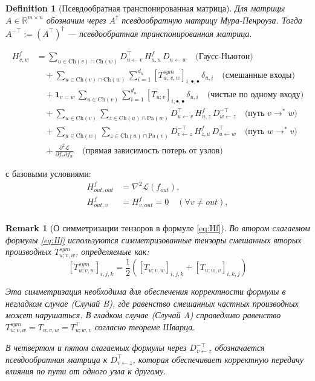 \documentclass[11pt]{article}
\newtheorem{remark}{Remark}
\newtheorem{definition}{Definition}
\newcommand{\Pa}{\mathrm{Pa}} %
\newcommand{\Ch}{\mathrm{Ch}} %
\begin{document}
\begin{definition}[Псевдообратная транспонированная матрица]
  Для матрицы $A \in \mathbb{R}^{m \times n}$ обозначим через $A^{\dagger}$ псевдообратную матрицу
  Мура-Пенроуза. Тогда $A^{-\top} := (A^\top)^{\dagger}$ — псевдообратная транспонированная матрица.
\end{definition}

\begin{equation}\label{eq:Hf}
  \boxed{
    \begin{split}
      H^f_{v,w}
      &=
      \sum_{u\in\Ch(v)\cap\Ch(w)}
      D_{u\gets v}^\top\,H^f_{u,u}\,D_{u\gets w}
      \quad\text{(Гаусс-Ньютон)}\\
      &\quad+
      \sum_{u\in\Ch(v)\cap\Ch(w)}
      \sum_{i=1}^{d_u}
      [T_{u;\,v,w}^{sym}]_{i,\bullet,\bullet}\,\delta_{u,i}
      \quad\text{(смешанные входы)}\\
      &\quad+
      \mathbf{1}_{v=w}\,
      \sum_{u\in\Ch(v)}
      \sum_{i=1}^{d_u}
      [T_{u;v}]_{i,\bullet,\bullet}\,\delta_{u,i}
      \quad\text{(чистые по одному входу)}\\
      &\quad+
      \sum_{u\in\Ch(v)}\sum_{z\in\Ch(u)\cap\Pa(w)}
      D_{u\gets v}^\top\,H^f_{u,z}\,D_{w\gets z}^{-\top}
      \quad\text{(путь $v \rightarrow^* w$)}\\
      &\quad+
      \sum_{u\in\Ch(w)}\sum_{z\in\Ch(u)\cap\Pa(v)}
      D_{v\gets z}^{-\top}\,H^f_{z,u}\,D_{u\gets w}^\top
      \quad\text{(путь $w \rightarrow^* v$)}\\
      &\quad+
      \frac{\partial^2 \mathcal{L}}{\partial f_v \partial f_w}
      \quad\text{(прямая зависимость потерь от узлов)}
    \end{split}
  }
\end{equation}

с базовыми условиями:
\begin{align}
  H^f_{out,out} &= \nabla^2\mathcal L(f_{out}), \nonumber\\
  H^f_{out,v} &= H^f_{v,out} = 0\quad (\forall v\neq out), \nonumber\\
\end{align}

\begin{remark}[О симметризации тензоров в формуле \eqref{eq:Hf}]
  Во втором слагаемом формулы \eqref{eq:Hf} используются симметризованные тензоры смешанных вторых
  производных $T_{u;v,w}^{sym}$, определяемые как:
  \[
    [T_{u;v,w}^{sym}]_{i,j,k} = \frac{1}{2}([T_{u;v,w}]_{i,j,k} + [T_{u;w,v}]_{i,k,j})
  \]

  Эта симметризация необходима для обеспечения корректности формулы в негладком случае (Случай B),
  где равенство смешанных частных производных может нарушаться. В гладком случае (Случай A)
  справедливо равенство $T_{u;v,w}^{sym} = T_{u;v,w} = T_{u;w,v}^{\top}$ согласно теореме Шварца.

  В четвертом и пятом слагаемых формулы через $D_{v\gets z}^{-\top}$ обозначается
  псевдообратная матрица к $D_{v\gets z}^{\top}$, которая обеспечивает корректную
  передачу влияния по пути от одного узла к другому.
\end{remark}
\end{document}
